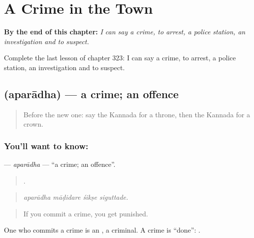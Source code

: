 
\chapter{A Crime in the Town}
\label{ch:ka-a-crime-in-the-town}

\begin{chapteropening}
\textbf{By the end of this chapter:} \emph{I can say a crime, to arrest, a police station, an investigation and to suspect.}

Complete the last lesson of chapter 323: I can say a crime, to arrest, a police station, an investigation and to suspect.
\end{chapteropening}

\section[\texorpdfstring{\kn{ಅಪರಾಧ} (aparādha)}{ಅಪರಾಧ (aparādha)}]{ (aparādha) — a crime; an offence}

\label{lesson:KA-C323-aparadha}



\begin{quote}
Before the new one: say the Kannada for a throne, then the Kannada for a crown.
\end{quote}

\subsection*{You'll want to know: }
\textbf{} — \emph{aparādha} — \textquotedblleft{}a crime; an offence\textquotedblright{}.

\begin{quote}
   .
\end{quote}

\begin{quote}
\emph{aparādha māḍidare śikṣe siguttade.}
\end{quote}

\begin{quote}
If you commit a crime, you get punished.
\end{quote}

One who commits a crime is an , a criminal. A crime is \textquotedblleft{}done\textquotedblright{}:  .

